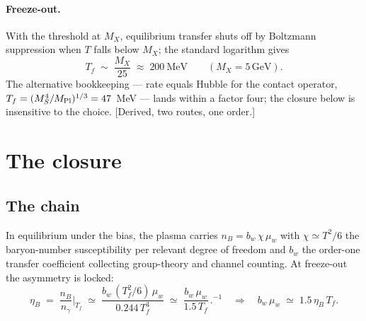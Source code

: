 \documentclass[11pt,a4paper]{article}
\newcommand{\GeV}{\,\mathrm{GeV}}
\begin{document}
\paragraph{Freeze-out.}
With the threshold at $M_X$, equilibrium transfer shuts off by Boltzmann
suppression when $T$ falls below $M_X$; the standard logarithm gives
\begin{equation}
T_f \;\sim\; \frac{M_X}{25} \;\approx\; 200\ \mathrm{MeV}
\qquad (M_X=5\GeV).
\label{eq:tf}
\end{equation}
The alternative bookkeeping --- rate equals Hubble for the contact operator,
$T_f=(M_S^4/M_{\rm Pl})^{1/3}=47$~MeV --- lands within a factor four; the
closure below is insensitive to the choice. [Derived, two routes, one order.]

\section{The closure}
\label{sec:closure}

\subsection{The chain}
In equilibrium under the bias, the plasma carries
$n_B=b_w\,\chi\,\mu_w$ with $\chi\simeq T^2/6$ the baryon-number
susceptibility per relevant degree of freedom and $b_w$ the order-one transfer
coefficient collecting group-theory and channel counting. At freeze-out the
asymmetry is locked:
\begin{equation}
\eta_B \;=\; \frac{n_B}{n_\gamma}\bigg|_{T_f}
\;\simeq\; \frac{b_w\,(T_f^2/6)\,\mu_w}{0.244\,T_f^3}
\;\simeq\; \frac{b_w\,\mu_w}{1.5\,T_f}\,\Big.^{-1}
\quad\Longrightarrow\quad
b_w\,\mu_w \;\simeq\; 1.5\,\eta_B\,T_f .
\label{eq:closure}
\end{equation}
\end{document}
